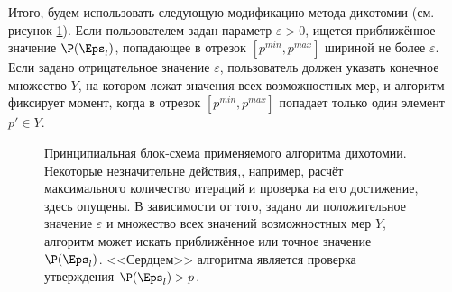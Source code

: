 Итого, будем использовать следующую модификацию метода дихотомии (см. рисунок \ref{ris:algo_scheme}). Если пользователем задан параметр $\varepsilon > 0$, ищется приближённое значение $\P(\Eps_l)$, попадающее в отрезок $[p^{min}, p^{max}]$ шириной не более $\varepsilon$. Если задано отрицательное значение $\varepsilon$, пользователь должен указать конечное множество $Y$, на котором лежат значения всех возможностных мер, и алгоритм фиксирует момент, когда в отрезок $[p^{min}, p^{max}]$ попадает только один элемент $p' \in Y$. %

\begin{figure}[h!]
\caption{\small Принципиальная блок-схема применяемого алгоритма дихотомии. Некоторые незначительне действия,, например, расчёт максимального количество итераций и проверка на его достижение, здесь опущены. В зависимости от того, задано ли положительное значение $\varepsilon$ и множество всех значений возможностных мер $Y$, алгоритм может искать приближённое или точное значение $\P(\Eps_l)$. <<Сердцем>> алгоритма является проверка утверждения $\P(\Eps_l) > p$.}
\label{ris:algo_scheme}
\end{figure}

